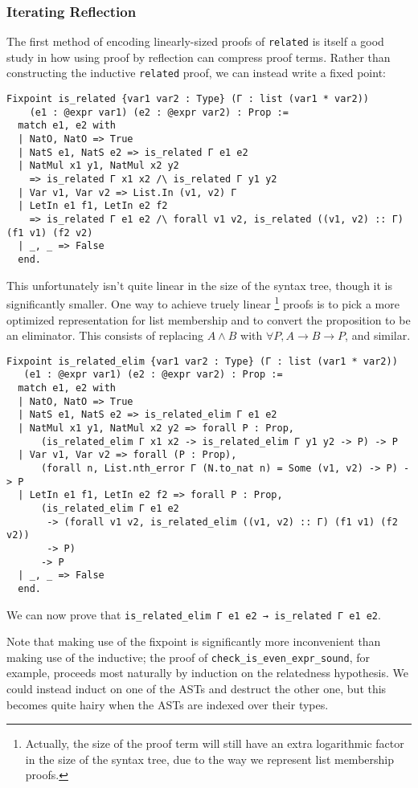 \subsubsection{Iterating Reflection} \label{sec:wf:perf:reflective}

The first method of encoding linearly-sized proofs of \texttt{related} is itself a good study in how using proof by reflection can compress proof terms.
Rather than constructing the inductive \texttt{related} proof, we can instead write a fixed point:
\begin{verbatim}
Fixpoint is_related {var1 var2 : Type} (Γ : list (var1 * var2))
    (e1 : @expr var1) (e2 : @expr var2) : Prop :=
  match e1, e2 with
  | NatO, NatO => True
  | NatS e1, NatS e2 => is_related Γ e1 e2
  | NatMul x1 y1, NatMul x2 y2
    => is_related Γ x1 x2 /\ is_related Γ y1 y2
  | Var v1, Var v2 => List.In (v1, v2) Γ
  | LetIn e1 f1, LetIn e2 f2
    => is_related Γ e1 e2 /\ forall v1 v2, is_related ((v1, v2) :: Γ) (f1 v1) (f2 v2)
  | _, _ => False
  end.
\end{verbatim}
This unfortunately isn't quite linear in the size of the syntax tree, though it is significantly smaller.
One way to achieve truely linear%
\footnote{%
Actually, the size of the proof term will still have an extra logarithmic factor in the size of the syntax tree, due to the way we represent list membership proofs.%
}
proofs is to pick a more optimized representation for list membership and to convert the proposition to be an eliminator.
This consists of replacing $A \wedge B$ with $\forall P, A \to B \to P$, and similar.
\begin{verbatim}
Fixpoint is_related_elim {var1 var2 : Type} (Γ : list (var1 * var2))
   (e1 : @expr var1) (e2 : @expr var2) : Prop :=
  match e1, e2 with
  | NatO, NatO => True
  | NatS e1, NatS e2 => is_related_elim Γ e1 e2
  | NatMul x1 y1, NatMul x2 y2 => forall P : Prop,
      (is_related_elim Γ x1 x2 -> is_related_elim Γ y1 y2 -> P) -> P
  | Var v1, Var v2 => forall (P : Prop),
      (forall n, List.nth_error Γ (N.to_nat n) = Some (v1, v2) -> P) -> P
  | LetIn e1 f1, LetIn e2 f2 => forall P : Prop,
      (is_related_elim Γ e1 e2
       -> (forall v1 v2, is_related_elim ((v1, v2) :: Γ) (f1 v1) (f2 v2))
       -> P)
      -> P
  | _, _ => False
  end.
\end{verbatim}
We can now prove that \texttt{is_related_elim Γ e1 e2 → is_related Γ e1 e2}.

Note that making use of the fixpoint is significantly more inconvenient than making use of the inductive; the proof of \texttt{check_is_even_expr_sound}, for example, proceeds most naturally by induction on the relatedness hypothesis.
We could instead induct on one of the ASTs and destruct the other one, but this becomes quite hairy when the ASTs are indexed over their types.


